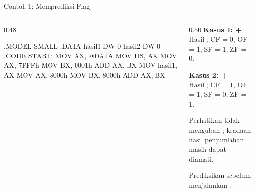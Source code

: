 \documentclass[aspectratio=169,11pt]{beamer}
\begin{document}
\begin{frame}[fragile]{Contoh 1: Memprediksi Flag}
\begin{columns}[t]
\begin{column}{0.48\textwidth}
\begin{kodeasm}
.MODEL SMALL
.DATA
    hasil1 DW 0
    hasil2 DW 0
.CODE
START:
    MOV AX, @DATA
    MOV DS, AX
    MOV AX, 7FFFh
    MOV BX, 0001h
    ADD AX, BX
    MOV hasil1, AX
    MOV AX, 8000h
    MOV BX, 8000h
    ADD AX, BX
\end{kodeasm}
\end{column}
\begin{column}{0.50\textwidth}
\footnotesize
{\color{obeTeal}\bfseries Kasus 1:  + }\\[0.15em]
Hasil ; CF = 0, OF = 1, SF = 1, ZF = 0.

\vspace{0.35em}
{\color{obeMaroon}\bfseries Kasus 2:  + }\\[0.15em]
Hasil ; CF = 1, OF = 1, SF = 0, ZF = 1.

\vspace{0.35em}
\begin{block}{Perhatikan}
\small {} tidak mengubah ; keadaan
hasil penjumlahan masih dapat diamati.
\end{block}

\vspace{0.2em}
{\color{obeGray}Prediksikan sebelum menjalankan .
\par}
\end{column}
\end{columns}
\end{frame}
\end{document}
